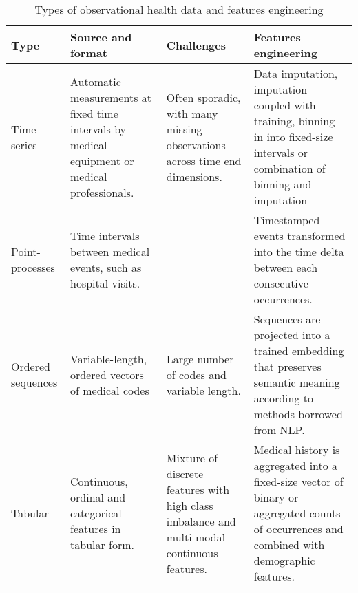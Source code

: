 \begin{table}
  \caption{Types of observational health data and features engineering}\label{tab:typeseng}
  
  \begin{tabular}{llll} \toprule
  
  Type & Source and format & Challenges & Features engineering\\ \midrule
  
  Time-series & Automatic measurements at fixed time intervals by medical equipment or medical professionals. & Often sporadic, with many missing observations across time end dimensions. & Data imputation, imputation coupled with training, binning in into fixed-size intervals or combination of binning and imputation\\
  Point-processes & Time intervals between medical events, such as hospital visits. & & Timestamped events transformed into the time delta between each consecutive occurrences.\\
  Ordered sequences & Variable-length, ordered vectors of medical codes & Large number of codes and variable length. & Sequences are projected into a trained embedding that preserves semantic meaning
  according to methods borrowed from NLP.\\
  Tabular & Continuous, ordinal and categorical features in tabular form. & Mixture of discrete features with high class imbalance and multi-modal continuous features. & Medical history is aggregated into a fixed-size vector of binary or aggregated counts of occurrences and combined with demographic features.\\
  \bottomrule
  \end{tabular}
\end{table}